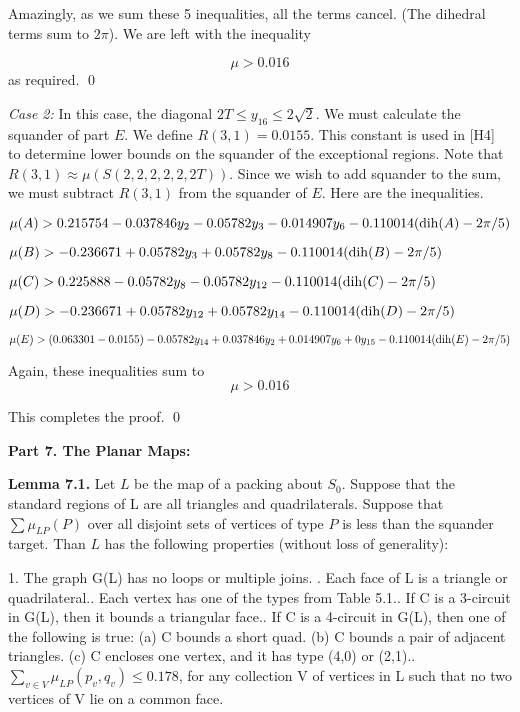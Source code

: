 Amazingly, as we sum these 5 inequalities, all the terms cancel.  (The dihedral terms sum to $2\pi$). We are left with the inequality 

$$\mu > 0.016$$
 as required. 
\qed

{\it Case 2:} In this case, the diagonal $2T\le y_{16}\le 2\sqrt 2$.  We must calculate the squander of part $E$.  
We define $R(3,1)=0.0155$.  This constant is used in [H4] to determine lower bounds on the squander of the exceptional regions.  Note that
$R(3,1)\approx \mu(S(2,2,2,2,2,2T))$.
Since we wish to add squander to the sum, we must subtract $R(3,1)$ from the squander of $E$.  Here are the inequalities.

$\mu(A) >  0.215754 - 0.037846 y_2 -0.05782 y_3 - 0.014907 y_6  - 0.110014 (\operatorname{dih}(A)-2 \pi /5)$\newline

$\mu(B) > - 0.236671 + 0.05782 y_3 + 0.05782 y_8  - 0.110014 (\operatorname{dih}(B)-2 \pi /5) $\newline

$\mu(C) > 0.225888 - 0.05782 y_8 -0.05782 y_{12}   
- 0.110014 (\operatorname{dih}(C)-2 \pi /5)$\newline

$\mu(D)> - 0.236671 + 0.05782 y_{12} + 0.05782 y_{14} - 0.110014 (\operatorname{dih}(D)-2 \pi /5)$\newline

$\mu(E) >  (0.063301-0.0155) - 0.05782 y_{14} + 0.037846 y_2 + 0.014907 y_6 + 0 y_{15} -  0.110014 (\operatorname{dih}(E)-2 \pi /5)$\newline


Again, these inequalities sum to $$\mu > 0.016$$

This completes the proof. \qed


\bigskip

\centerline{{\bf Part 7. The Planar Maps:}}
\bigskip

{\bf Lemma 7.1.} Let $L$ be the map of a packing about $S_0$.
Suppose that the standard regions of L are all triangles and quadrilaterals.  
Suppose that $\sum \mu_{LP}(P)$ over all disjoint sets of vertices of type $P$ is less than the squander target.  
Than $L$ has the following properties (without loss of generality): 

1. The graph G(L) has no loops or multiple joins. . Each face of L is a triangle or quadrilateral.. Each vertex has one of the types from Table 5.1.. If C is a 3-circuit in G(L), then it bounds a triangular face.. If C is a 4-circuit in G(L), then one of the following is true:\newline
(a) C bounds a short quad. \newline
(b) C bounds a pair of adjacent triangles.\newline
(c) C encloses one vertex, and it has type (4,0) or (2,1).. $\sum_{v\in V} \mu_{LP}(p_v,q_v) \leq 0.178$, for any collection V of vertices in L such that no two vertices of V lie on a common face. \newline 


